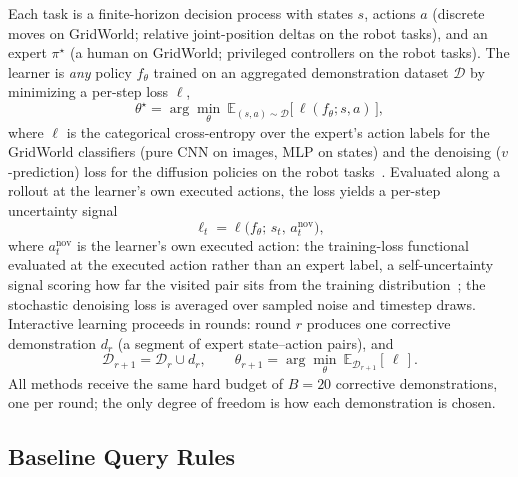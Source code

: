\documentclass[letterpaper]{article} %
\begin{document}
Each task is a finite-horizon decision process with states $s$, actions $a$
(discrete moves on GridWorld; relative joint-position deltas on the robot
tasks), and an expert $\pi^\star$ (a human on GridWorld; privileged
controllers on the robot tasks). The learner is \emph{any}
policy $f_\theta$ trained on an aggregated demonstration dataset
$\mathcal{D}$ by minimizing a per-step loss $\ell$,
\begin{equation}
\theta^\star=\arg\min_{\theta}\
\mathbb{E}_{(s,a)\sim\mathcal{D}}\big[\,\ell(f_\theta;s,a)\,\big],
\label{eq:il}
\end{equation}
where $\ell$ is the categorical cross-entropy over the expert's action labels
for the GridWorld classifiers (pure CNN on images, MLP on states) and the
denoising ($v$-prediction) loss for the diffusion policies on the robot
tasks~\citep{ho2020ddpm,chi2023diffusionpolicy}.
Evaluated along a rollout at the learner's own executed actions, the loss
yields a per-step uncertainty signal
\begin{equation}
\ell_t=\ell\big(f_\theta;\,s_t,\,a^{\mathrm{nov}}_t\big),
\label{eq:signal}
\end{equation}
where $a^{\mathrm{nov}}_t$ is the learner's own executed action: the
training-loss functional evaluated at the executed action rather than an
expert label, a self-uncertainty signal scoring how far the visited pair
sits from the training distribution~\citep{lee2025diffdagger}; the
stochastic denoising loss is averaged over sampled noise and timestep
draws. Interactive learning proceeds in
rounds: round $r$ produces one corrective demonstration $d_r$ (a segment of
expert state--action pairs), and
\begin{equation}
\mathcal{D}_{r+1}=\mathcal{D}_r\cup d_r,
\qquad
\theta_{r+1}=\arg\min_{\theta}\
\mathbb{E}_{\mathcal{D}_{r+1}}[\,\ell\,].
\label{eq:loop}
\end{equation}
All methods receive the same hard budget of $B{=}20$ corrective
demonstrations, one per round; the only degree of freedom is how each
demonstration is chosen.

\subsection{Baseline Query Rules}
\label{sec:unified}
\end{document}
